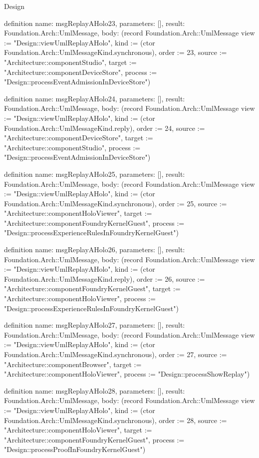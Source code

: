\begin{lexlean}{Design}
\begin{semanticmodule}
definition{
  name: msgReplayAHolo23,
  parameters: [],
  result: Foundation.Arch::UmlMessage,
  body: (record Foundation.Arch::UmlMessage {view := "Design::viewUmlReplayAHolo", kind := (ctor Foundation.Arch::UmlMessageKind.synchronous), order := 23, source := "Architecture::componentStudio", target := "Architecture::componentDeviceStore", process := "Design::processEventAdmissionInDeviceStore"})
}

definition{
  name: msgReplayAHolo24,
  parameters: [],
  result: Foundation.Arch::UmlMessage,
  body: (record Foundation.Arch::UmlMessage {view := "Design::viewUmlReplayAHolo", kind := (ctor Foundation.Arch::UmlMessageKind.reply), order := 24, source := "Architecture::componentDeviceStore", target := "Architecture::componentStudio", process := "Design::processEventAdmissionInDeviceStore"})
}

definition{
  name: msgReplayAHolo25,
  parameters: [],
  result: Foundation.Arch::UmlMessage,
  body: (record Foundation.Arch::UmlMessage {view := "Design::viewUmlReplayAHolo", kind := (ctor Foundation.Arch::UmlMessageKind.synchronous), order := 25, source := "Architecture::componentHoloViewer", target := "Architecture::componentFoundryKernelGuest", process := "Design::processExperienceRulesInFoundryKernelGuest"})
}

definition{
  name: msgReplayAHolo26,
  parameters: [],
  result: Foundation.Arch::UmlMessage,
  body: (record Foundation.Arch::UmlMessage {view := "Design::viewUmlReplayAHolo", kind := (ctor Foundation.Arch::UmlMessageKind.reply), order := 26, source := "Architecture::componentFoundryKernelGuest", target := "Architecture::componentHoloViewer", process := "Design::processExperienceRulesInFoundryKernelGuest"})
}

definition{
  name: msgReplayAHolo27,
  parameters: [],
  result: Foundation.Arch::UmlMessage,
  body: (record Foundation.Arch::UmlMessage {view := "Design::viewUmlReplayAHolo", kind := (ctor Foundation.Arch::UmlMessageKind.synchronous), order := 27, source := "Architecture::componentBrowser", target := "Architecture::componentHoloViewer", process := "Design::processShowReplay"})
}

definition{
  name: msgReplayAHolo28,
  parameters: [],
  result: Foundation.Arch::UmlMessage,
  body: (record Foundation.Arch::UmlMessage {view := "Design::viewUmlReplayAHolo", kind := (ctor Foundation.Arch::UmlMessageKind.synchronous), order := 28, source := "Architecture::componentHoloViewer", target := "Architecture::componentFoundryKernelGuest", process := "Design::processProofInFoundryKernelGuest"})
}


\end{semanticmodule}
\end{lexlean}
